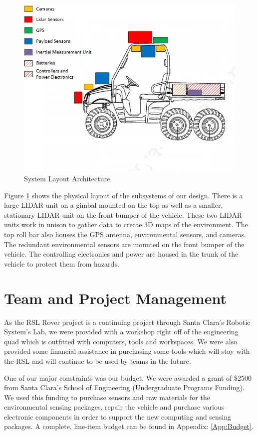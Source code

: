 \begin{figure}[H]
\centering
\includegraphics[width=.7\linewidth]{SensorLayout}
\caption{System Layout Architecture}
\label{fig:systemlayout}
\end{figure}

Figure \ref{fig:systemlayout} shows the physical layout of the subsystems of our design. There is a large LIDAR unit on a gimbal mounted on the top as well as a smaller, stationary LIDAR unit on the front bumper of the vehicle. These two LIDAR units work in unison to gather data to create 3D maps of the environment. The top roll bar also houses the GPS antenna, environmental sensors, and cameras. The redundant environmental sensors are mounted on the front bumper of the vehicle. The controlling electronics and power are housed in the trunk of the vehicle to protect them from hazards.

%
\section{Team and Project Management}

As the RSL Rover project is a continuing project through Santa Clara's Robotic System's Lab, we were provided with a workshop right off of the engineering quad which is outfitted with computers, tools and workspaces. We were also provided some financial assistance in purchasing some tools which will stay with the RSL and will continue to be used by teams in the future. 

One of our major constraints was our budget. We were awarded a grant of \$2500 from Santa Clara's School of Engineering (Undergraduate Programs Funding). We used this funding to purchase sensors and raw materials for the environmental sensing packages, repair the vehicle and purchase various electronic components in order to support the new computing and sensing packages. A complete, line-item budget can be found in Appendix: \ref{App:Budget}. 

